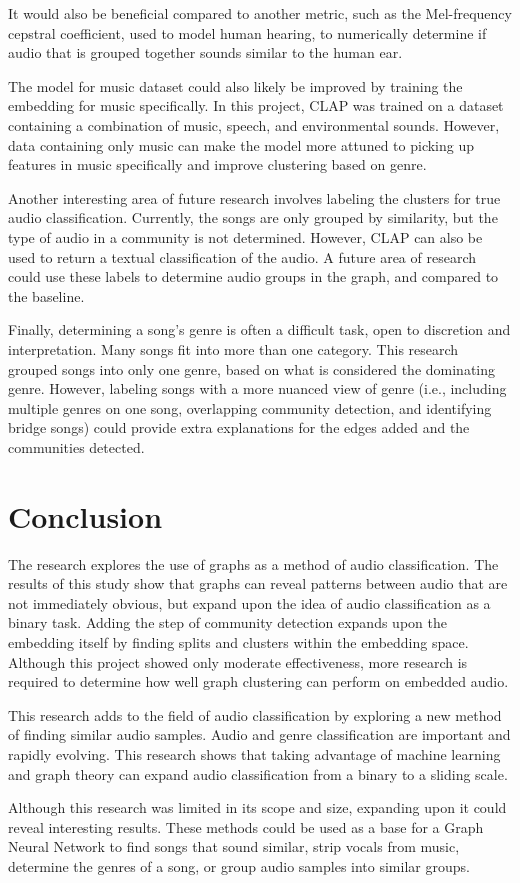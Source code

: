\documentclass{article}
\begin{document}
It would also be beneficial compared to another metric, such as the Mel-frequency cepstral coefficient, used to model human hearing, to numerically determine if audio that is grouped together sounds similar to the human ear.

The model for music dataset could also likely be improved by training the embedding for music specifically. In this project, CLAP was trained on a dataset containing a combination of music, speech, and environmental sounds. However, data containing only music can make the model more attuned to picking up features in music specifically and improve clustering based on genre.

Another interesting area of future research involves labeling the clusters for true audio classification. Currently, the songs are only grouped by similarity, but the type of audio in a community is not determined. However, CLAP can also be used to return a textual classification of the audio. A future area of research could use these labels to determine audio groups in the graph, and compared to the baseline.

Finally, determining a song's genre is often a difficult task, open to discretion and interpretation. Many songs fit into more than one category. This research grouped songs into only one genre, based on what is considered the dominating genre. However, labeling songs with a more nuanced view of genre (i.e., including multiple genres on one song, overlapping community detection, and identifying bridge songs) could provide extra explanations for the edges added and the communities detected.

\section{Conclusion}
The research explores the use of graphs as a method of audio classification. The results of this study show that graphs can reveal patterns between audio that are not immediately obvious, but expand upon the idea of audio classification as a binary task. Adding the step of community detection expands upon the embedding itself by finding splits and clusters within the embedding space. Although this project showed only moderate effectiveness, more research is required to determine how well graph clustering can perform on embedded audio.

This research adds to the field of audio classification by exploring a new method of finding similar audio samples. Audio and genre classification are important and rapidly evolving. This research shows that taking advantage of machine learning and graph theory can expand audio classification from a binary to a sliding scale.

Although this research was limited in its scope and size, expanding upon it could reveal interesting results. These methods could be used as a base for a Graph Neural Network to find songs that sound similar, strip vocals from music, determine the genres of a song, or group audio samples into similar groups.

\medskip

\printbibliography
\end{document}
